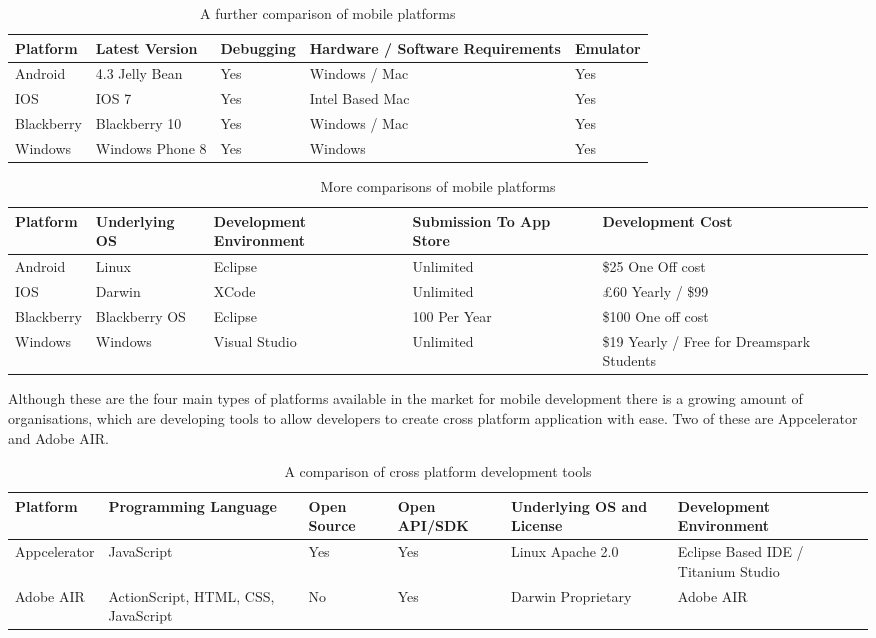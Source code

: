 \begin{table}[H]
    \centering
    \small
    \begin{tabular}{|p{2cm}|p{3.5cm}|p{2.2cm}|p{4.5cm}|p{2cm}|}
    \hline
    \textbf{Platform} & \textbf{Latest Version} & \textbf{Debugging} &
    \textbf{Hardware / Software Requirements} & \textbf{Emulator} \\ \hline
    Android & 4.3 Jelly Bean & Yes & Windows / Mac & Yes \\ \hline
    IOS & IOS 7 & Yes & Intel Based Mac & Yes  \\ \hline
    Blackberry & Blackberry 10 & Yes & Windows / Mac & Yes \\ \hline
    Windows & Windows Phone 8 & Yes & Windows & Yes \\ \hline
    \end{tabular}
    \caption {A further comparison of mobile platforms}
\end{table}

\begin{table}[H]
    \centering
    \small
    \begin{tabular}{|p{2cm}|p{2.2cm}|p{3cm}|p{3cm}|p{4cm}|}
    \hline
    \textbf{Platform} & \textbf{Underlying OS} & \textbf{Development
    Environment} & \textbf{Submission To App Store} & \textbf{Development Cost}
    \\ \hline
    Android & Linux & Eclipse & Unlimited & \$25 One Off cost \\ \hline
    IOS & Darwin & XCode & Unlimited & \pounds60 Yearly / \$99 \\ \hline
    Blackberry & Blackberry OS & Eclipse & 100 Per Year & \$100 One off cost
    \\ \hline
    Windows & Windows & Visual Studio & Unlimited & \$19 Yearly / Free for
    Dreamspark Students \\ \hline
    \end{tabular}
    \caption{More comparisons of mobile platforms}
\end{table}

Although these are the four main types of platforms available in the market for
mobile development there is a growing amount of organisations, which are
developing tools to allow developers to create cross platform application with
ease. Two of these are Appcelerator and Adobe AIR.

\begin{table}[H]
    \centering
    \small
    \begin{tabular}{|p{2.5cm}|p{2.7cm}|p{1.8cm}|p{2cm}|p{2.8cm}|p{2.8cm}|}
    \hline
    \textbf{Platform} & \textbf{Programming Language} & \textbf{Open Source} &
    \textbf{Open API/SDK} & \textbf{Underlying OS and License} &
    \textbf{Development Environment} \\ \hline
    Appcelerator & JavaScript & Yes & Yes & Linux Apache 2.0 & Eclipse Based
    IDE / Titanium Studio \\ \hline
    Adobe AIR & ActionScript, HTML, CSS, JavaScript & No & Yes & Darwin
    Proprietary & Adobe AIR \\ \hline
    \end{tabular}
    \caption {A comparison of cross platform development tools}
\end{table}

